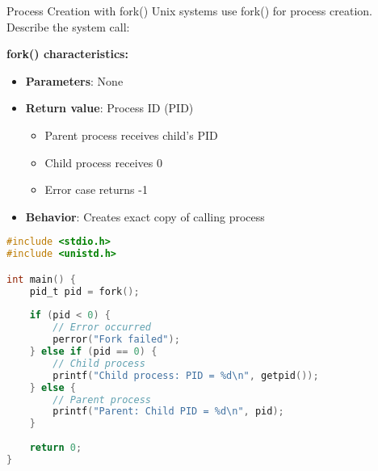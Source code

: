 \begin{example2}{Process Creation with fork()}
    Unix systems use fork() for process creation. Describe the system call:
    
    \tcblower
    
    \textbf{fork() characteristics:}
    \begin{itemize}
        \item \textbf{Parameters}: None
        \item \textbf{Return value}: Process ID (PID)
            \begin{itemize}
                \item Parent process receives child's PID
                \item Child process receives 0
                \item Error case returns -1
            \end{itemize}
        \item \textbf{Behavior}: Creates exact copy of calling process
    \end{itemize}
    
\begin{lstlisting}[language=C, style=basesmol]
#include <stdio.h>
#include <unistd.h>

int main() {
    pid_t pid = fork();
    
    if (pid < 0) {
        // Error occurred
        perror("Fork failed");
    } else if (pid == 0) {
        // Child process
        printf("Child process: PID = %d\n", getpid());
    } else {
        // Parent process
        printf("Parent: Child PID = %d\n", pid);
    }
    
    return 0;
}
\end{lstlisting}
\end{example2}

